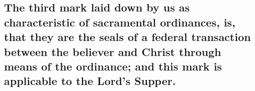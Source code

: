 \documentclass[english,]{book}
\begin{document}
\hypertarget{the-third-mark-laid-down-by-us-as-characteristic-of-sacramental-ordinances-is-that-they-are-the-seals-of-a-federal-transaction-between-the-believer-and-christ-through-means-of-the-ordinance-and-this-mark-is-applicable-to-the-lords-supper.}{%
\subsection{The third mark laid down by us as characteristic of sacramental ordinances, is, that they are the seals of a federal transaction between the believer and Christ through means of the ordinance; and this mark is applicable to the Lord's Supper.}\label{the-third-mark-laid-down-by-us-as-characteristic-of-sacramental-ordinances-is-that-they-are-the-seals-of-a-federal-transaction-between-the-believer-and-christ-through-means-of-the-ordinance-and-this-mark-is-applicable-to-the-lords-supper.}}
\end{document}
